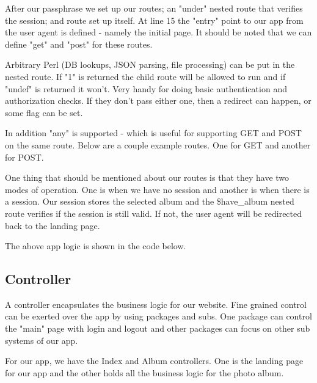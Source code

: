 \documentclass[14pt]{extreport}
\begin{document}
After our passphrase we set up our routes; an "under" nested route that verifies
the session; and route set up itself.  At line 15 the "entry" point to our app
from the user agent is defined - namely the initial page.  It should be noted
that we can define "get" and "post" for these routes.  



Arbitrary Perl (DB lookups, JSON parsing, file processing) can be put in the
nested route.  If "1" is returned the child route will be allowed to run and if
"undef" is returned it won't.  Very handy for doing basic authentication and
authorization checks.  If they don't pass either one, then a redirect can
happen, or some flag can be set.

\clearpage

In addition "any" is supported - which is useful for supporting GET and POST on
the same route.  Below are a couple example routes.  One for GET and another
for POST.



One thing that should be mentioned about our routes is that they have two modes of
operation.  One is when we have no session and another is when there is a session.
Our session stores the selected album and the \$have\_album nested route verifies
if the session is still valid.  If not, the user agent will be redirected back to the
landing page.

The above app logic is shown in the code below.



\subsection{Controller}

A controller encapsulates the business logic for our website.  Fine grained
control can be exerted over the app by using packages and subs.  One package
can control the "main" page with login and logout and other packages can focus
on other sub systems of our app.

For our app, we have the Index and Album controllers.  One is the landing page for
our app and the other holds all the business logic for the photo album.
\end{document}
